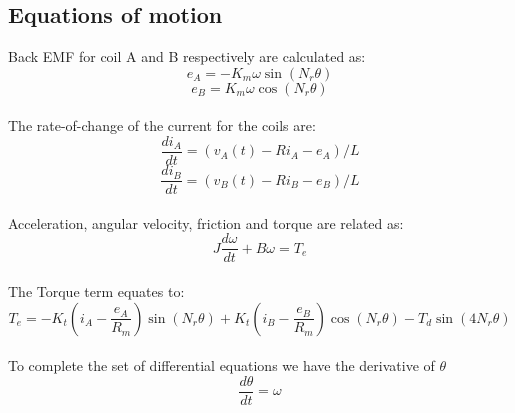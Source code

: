 \documentclass{article}
\begin{document}
\begin{appendix}

\section{Equations of motion}
Back EMF for coil A and B respectively are calculated as:
\begin{equation}\label{e_A}
	e_A = -K_m \omega \sin(N_r\theta)
\end{equation}
\begin{equation}\label{e_B}
	e_B = K_m \omega \cos(N_r\theta)
\end{equation}
\\
The rate-of-change of the current for the coils are:
\begin{equation}\label{di_A}
	\frac{di_A}{dt} = (v_A(t) - R i_A - e_A ) / L
\end{equation}
\begin{equation}\label{di_B}
	\frac{di_B}{dt} = (v_B(t) - R i_B - e_B ) / L
\end{equation}
\\
Acceleration, angular velocity, friction and torque are related as:
\begin{equation}\label{acceleration}
	J \frac{d \omega}{dt} + B \omega = T_e
\end{equation}
\\
The Torque term equates to:
\begin{equation}\label{torque}
	T_e = 	- K_t \left(i_A - \frac{e_A}{R_m}\right)\sin(N_r\theta)	
	 		+ K_t \left(i_B - \frac{e_B}{R_m}\right) \cos(N_r\theta)
	 		- T_d\sin(4N_r\theta)
\end{equation}
\\
To complete the set of differential equations we have the derivative of $\theta$ 
\begin{equation}\label{mathworks:velocity}
	\frac{d\theta}{dt} = \omega
\end{equation}

\end{appendix}
\end{document}

